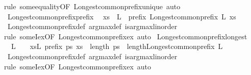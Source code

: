 \begin{isabellebody}
\isamarkupfalse%
{\isacharparenleft}rule\ some{}{\isacharunderscore}equality{\isacharbrackleft}OF\ Longest{\isacharunderscore}common{\isacharunderscore}prefix{\isacharunderscore}unique{\isacharbrackright}{\isacharparenright}\ auto%
\endisatagproof
{\isafoldproof}%
%
\isadelimproof
\isanewline
%
\endisadelimproof
\isanewline
{}\isamarkupfalse%
\ Longest{\isacharunderscore}common{\isacharunderscore}prefix{\isacharunderscore}prefix{\isacharcolon}\isanewline
\ \ {\isachardoublequoteopen}xs\ {\isasymin}\ L\ {\isasymLongrightarrow}\ prefix\ {\isacharparenleft}Longest{\isacharunderscore}common{\isacharunderscore}prefix\ L{\isacharparenright}\ xs{\isachardoublequoteclose}\isanewline
%
\isadelimproof
%
\endisadelimproof
%
\isatagproof
{}\isamarkupfalse%
\ Longest{\isacharunderscore}common{\isacharunderscore}prefix{\isacharunderscore}def\ arg{\isacharunderscore}max{\isacharunderscore}def\ is{\isacharunderscore}arg{\isacharunderscore}max{\isacharunderscore}linorder\isanewline
{}\isamarkupfalse%
{\isacharparenleft}rule\ someI{}{\isacharunderscore}ex{\isacharbrackleft}OF\ Longest{\isacharunderscore}common{\isacharunderscore}prefix{\isacharunderscore}ex{\isacharbrackright}{\isacharparenright}\ auto%
\endisatagproof
{\isafoldproof}%
%
\isadelimproof
\isanewline
%
\endisadelimproof
\isanewline
{}\isamarkupfalse%
\ Longest{\isacharunderscore}common{\isacharunderscore}prefix{\isacharunderscore}longest{\isacharcolon}\isanewline
\ \ {\isachardoublequoteopen}L\ {\isasymnoteq}\ {\isacharbraceleft}{\isacharbraceright}\ {\isasymLongrightarrow}\ {\isasymforall}xs{\isasymin}L{\isachardot}\ prefix\ ps\ xs\ {\isasymLongrightarrow}\ length\ ps\ {\isasymle}\ length{\isacharparenleft}Longest{\isacharunderscore}common{\isacharunderscore}prefix\ L{\isacharparenright}{\isachardoublequoteclose}\isanewline
%
\isadelimproof
%
\endisadelimproof
%
\isatagproof
{}\isamarkupfalse%
\ Longest{\isacharunderscore}common{\isacharunderscore}prefix{\isacharunderscore}def\ arg{\isacharunderscore}max{\isacharunderscore}def\ is{\isacharunderscore}arg{\isacharunderscore}max{\isacharunderscore}linorder\isanewline
{}\isamarkupfalse%
{\isacharparenleft}rule\ someI{}{\isacharunderscore}ex{\isacharbrackleft}OF\ Longest{\isacharunderscore}common{\isacharunderscore}prefix{\isacharunderscore}ex{\isacharbrackright}{\isacharparenright}\ auto%
\endisatagproof
{\isafoldproof}%
%
\isadelimproof
\isanewline
%
\endisadelimproof
\isanewline
{}\isamarkupfalse%

\end{isabellebody}
